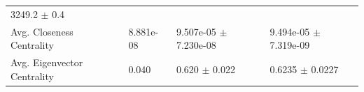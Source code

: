 \documentclass[12pt,twoside]{amherstthesis}
\begin{document}
\begin{longtable}[]{@{}llll@{}}
\begin{minipage}[t]{0.25\columnwidth}
  3249.2 \(\pm\) 0.4\strut
  \end{minipage}\tabularnewline
  \begin{minipage}[t]{0.27\columnwidth}\raggedright\strut
  Avg. Closeness Centrality\strut
  \end{minipage} & \begin{minipage}[t]{0.11\columnwidth}\raggedright\strut
  8.881e-08\strut
  \end{minipage} & \begin{minipage}[t]{0.25\columnwidth}\raggedright\strut
  9.507e-05 \(\pm\) 7.230e-08\strut
  \end{minipage} & \begin{minipage}[t]{0.25\columnwidth}\raggedright\strut
  9.494e-05 \(\pm\) 7.319e-09\strut
  \end{minipage}\tabularnewline
  \begin{minipage}[t]{0.27\columnwidth}\raggedright\strut
  Avg. Eigenvector Centrality\strut
  \end{minipage} & \begin{minipage}[t]{0.11\columnwidth}\raggedright\strut
  0.040\strut
  \end{minipage} & \begin{minipage}[t]{0.25\columnwidth}\raggedright\strut
  0.620 \(\pm\) 0.022\strut
  \end{minipage} & \begin{minipage}[t]{0.25\columnwidth}\raggedright\strut
  0.6235 \(\pm\) 0.0227\strut
  \end{minipage}\tabularnewline
  \bottomrule
  \end{longtable}
  
\end{document}
